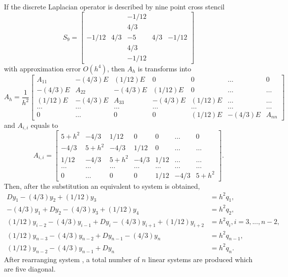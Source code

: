 \documentclass[11pt,a4paper,twoside]{article}
\begin{document}
If the discrete Laplacian operator is described by nine point cross stencil
\[
S_9 =
\begin{bmatrix}
          &       &  -1/12  & &  \\
          &       &  4/3     &   & \\
-1/12 & 4/3 &  -5       & 4/3 & -1/12\\
          &       &   4/3    &    &\\
          &       &  -1/12  &    &
\end{bmatrix}
\]
with approximation error $O(h^4)$, then $A_h$ is transforms into
\[
A_h = \frac{1}{h^2}
\begin{bmatrix}
    A_{11}            & -(4/3)E    &  (1/12)E       & 0                       & 0                      & \dots  & 0 \\
    -(4/3)E            & A_{22}    & -(4/3)E        &  (1/12)E         & 0                      & \dots & \dots   \\
    (1/12)E            & -(4/3)E   &      A_{33}  & -(4/3)E            & (1/12)E             & \dots  & \dots   \\
      \dots             & \dots       & \dots                       & \dots                &    \dots             &  \dots &    \dots  \\
     0                    & \dots        &  0                             &  0                     & (1/12)E             & -(4/3)E & A_{nn}
\end{bmatrix}
\]
and $A_{i,i}$ equals to
\[
A_{i,i} = 
\begin{bmatrix}
    5 + h^2  & -4/3          &  1/12       & 0         & 0                      & \dots  & 0 \\
    -4/3         & 5 + h^2   &  -4/3        &  1/12  & 0                    & \dots & \dots   \\
    1/12        &  -4/3         & 5 + h^2  &  -4/3   &  1/12              & \dots & \dots   \\
      \dots             & \dots                 & \dots                       & \dots                &    \dots             &  \dots &    \dots  \\
     0                    & \dots                 &  0                             &  0                     & 1/12                 & -4/3    & 5 + h^2
\end{bmatrix}.
\]
Then, after the substitution  an equivalent to  system is obtained,
\begin{align}
Dy_1 - (4/3)y_2 + (1/12)y_3 &= h^2 q_1,\nonumber \\
-(4/3)y_1 + Dy_2 - (4/3)y_3 + (1/12)y_4  &= h^2 q_2,\nonumber \\
 (1/12)y_{i-2} - (4/3)y_{i-1} + D y_i - (4/3)y_{i+1} + (1/12)y_{i+2} &= h^2 q_i, i = 3,...,n-2,\nonumber \\
 (1/12)y_{n-3} - (4/3)y_{n-2} + Dy_{n-1} - (4/3)y_n &= h^2 q_{n-1}, \nonumber \\
 (1/12)y_{n-2} - (4/3)y_{n-1} + Dy_n &= h^2 q_n.\label{SubSys5}
\end{align}
After rearranging system , a total number of $n$ linear systems are produced which are five diagonal.
\end{document}
